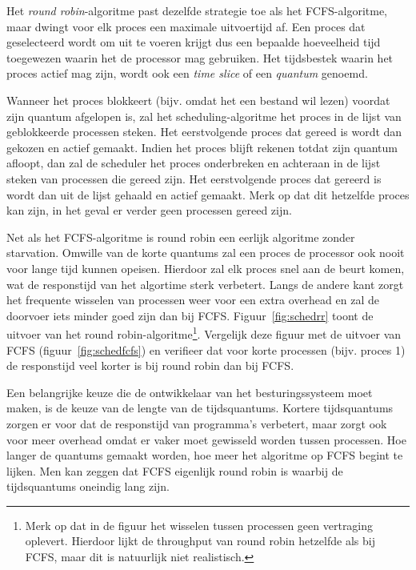 Het \emph{round robin}-algoritme past dezelfde strategie toe als het FCFS-algoritme, maar dwingt voor elk proces een maximale uitvoertijd af. Een proces dat geselecteerd wordt om uit te voeren krijgt dus een bepaalde hoeveelheid tijd toegewezen waarin het de processor mag gebruiken. Het tijdsbestek waarin het proces actief mag zijn, wordt ook een \emph{time slice} of een \emph{quantum} genoemd.

Wanneer het proces blokkeert (bijv. omdat het een bestand wil lezen) voordat zijn quantum afgelopen is, zal het scheduling-algoritme het proces in de lijst van geblokkeerde processen steken. Het eerstvolgende proces dat gereed is wordt dan gekozen en actief gemaakt. Indien het proces blijft rekenen totdat zijn quantum afloopt, dan zal de scheduler het proces onderbreken en achteraan in de lijst steken van processen die gereed zijn. Het eerstvolgende proces dat gereerd is wordt dan uit de lijst gehaald en actief gemaakt. Merk op dat dit hetzelfde proces kan zijn, in het geval er verder geen processen gereed zijn.

Net als het FCFS-algoritme is round robin een eerlijk algoritme zonder starvation. Omwille van de korte quantums zal een proces de processor ook nooit voor lange tijd kunnen opeisen. Hierdoor zal elk proces snel aan de beurt komen, wat de responstijd van het algortime sterk verbetert. Langs de andere kant zorgt het frequente wisselen van processen weer voor een extra overhead en zal de doorvoer iets minder goed zijn dan bij FCFS. Figuur~\ref{fig:schedrr} toont de uitvoer van het round robin-algoritme\footnote{Merk op dat in de figuur het wisselen tussen processen geen vertraging oplevert. Hierdoor lijkt de throughput van round robin hetzelfde als bij FCFS, maar dit is natuurlijk niet realistisch.}. Vergelijk deze figuur met de uitvoer van FCFS (figuur~\ref{fig:schedfcfs}) en verifieer dat voor korte processen (bijv. proces 1) de responstijd veel korter is bij round robin dan bij FCFS.

Een belangrijke keuze die de ontwikkelaar van het besturingssysteem moet maken, is de keuze van de lengte van de tijdsquantums. Kortere tijdsquantums zorgen er voor dat de responstijd van programma's verbetert, maar zorgt ook voor meer overhead omdat er vaker moet gewisseld worden tussen processen. Hoe langer de quantums gemaakt worden, hoe meer het algoritme op FCFS begint te lijken. Men kan zeggen dat FCFS eigenlijk round robin is waarbij de tijdsquantums oneindig lang zijn.

